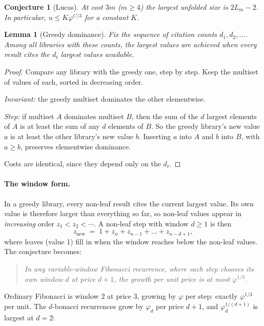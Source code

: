 \documentclass[11pt]{article}
\newtheorem{lemma}[theorem]{Lemma}
\newtheorem{conj}{Conjecture}
\theoremstyle{remark}
\begin{document}
\begin{conj}[Lucas]
At cost $3m$ ($m\ge4$) the largest unfolded size is $2L_m-2$. In particular,
$u\le K\varphi^{C/3}$ for a constant $K$.
\end{conj}

\begin{lemma}[Greedy dominance]\label{lem:greedy}
Fix the sequence of citation counts $d_1,d_2,\ldots$. Among all libraries with these
counts, the largest values are achieved when every result cites the $d_t$ \emph{largest}
values available.
\end{lemma}
\begin{proof}
Compare any library with the greedy one, step by step. Keep the multiset of values of
each, sorted in decreasing order.

\emph{Invariant:} the greedy multiset dominates the other elementwise.

\emph{Step:} if multiset $A$ dominates multiset $B$, then the sum of the $d$ largest
elements of $A$ is at least the sum of any $d$ elements of $B$. So the greedy library's
new value $a$ is at least the other library's new value $b$. Inserting $a$ into $A$ and $b$
into $B$, with $a\ge b$, preserves elementwise dominance.

Costs are identical, since they depend only on the $d_t$.
\end{proof}

\paragraph{The window form.} In a greedy library, every non-leaf result cites the current
largest value. Its own value is therefore larger than everything so far, so non-leaf
values appear in \emph{increasing} order $z_1<z_2<\cdots$. A non-leaf step with window
$d\ge1$ is then
\[
z_{\text{new}} \;=\; 1 + z_n + z_{n-1} + \dots + z_{n-d+1},
\]
where leaves (value 1) fill in when the window reaches below the non-leaf values. The
conjecture becomes:

\begin{quote}\itshape
In any variable-window Fibonacci recurrence, where each step chooses its own window $d$ at
price $d+1$, the growth per unit price is at most $\varphi^{1/3}$.
\end{quote}

\noindent Ordinary Fibonacci is window $2$ at price $3$, growing by $\varphi$ per step:
exactly $\varphi^{1/3}$ per unit. The $d$-bonacci recurrences grow by $\varphi_d$ per price
$d+1$, and $\varphi_d^{1/(d+1)}$ is largest at $d=2$:
\end{document}

